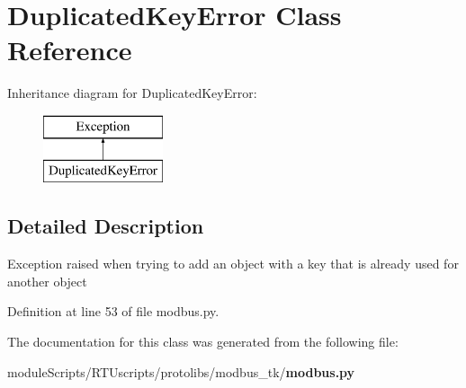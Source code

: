 \section{Duplicated\+Key\+Error Class Reference}
\label{classprotolibs_1_1modbus__tk_1_1modbus_1_1_duplicated_key_error}
Inheritance diagram for Duplicated\+Key\+Error\+:\begin{figure}[H]
\begin{center}
\leavevmode
\includegraphics[height=2.000000cm]{classprotolibs_1_1modbus__tk_1_1modbus_1_1_duplicated_key_error}
\end{center}
\end{figure}


\subsection{Detailed Description}
\begin{DoxyVerb}Exception raised when trying to add an object with a key that is already 
used for another object
\end{DoxyVerb}
 

Definition at line 53 of file modbus.\+py.



The documentation for this class was generated from the following file\+:\begin{DoxyCompactItemize}
\item 
module\+Scripts/\+R\+T\+Uscripts/protolibs/modbus\+\_\+tk/{\bf modbus.\+py}\end{DoxyCompactItemize}
